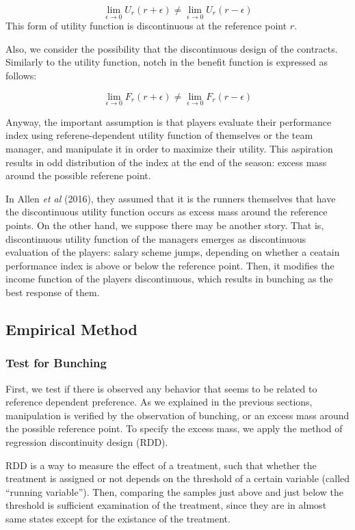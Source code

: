 \documentclass[dvipdfmx, 12pt]{article}
\begin{document}
\[
\lim_{\epsilon \to 0} U_r (r + \epsilon) \neq
\lim_{\epsilon \to 0} U_r (r - \epsilon)
\]
This form of utility function is discontinuous at the reference point $r$.

Also, we consider the possibility that the discontinuous design of the contracts. Similarly to the utility function, notch in the benefit function is expressed as follows:

\[
\lim_{\epsilon \to 0} F_r (r + \epsilon) \neq
\lim_{\epsilon \to 0} F_r (r - \epsilon)
\]

Anyway, the important assumption is that players evaluate their performance index using referene-dependent utility function of themselves or the team manager, and manipulate it in order to maximize their utility. This aspiration results in odd distribution of the index at the end of the season: excess mass around the possible referene point.

In Allen \textit{et al} (2016), they assumed that it is the runners  themselves that have the discontinuous utility function occurs as excess mass around the reference points. On the other hand, we suppose there may be another story. That is, discontinuous utility function of the managers emerges as discontinuous evaluation of the players: salary scheme jumps, depending on whether a ceatain performance index is above or below the reference point. Then, it modifies the income function of the players discontinuous, which results in bunching as the best response of them.

 \subsection{Empirical Method}

  \subsubsection{Test for Bunching}

  First, we test if there is observed any behavior that seems to be related to reference dependent preference. As we explained in the previous sections, manipulation is verified by the observation of bunching, or an excess mass around the possible reference point. To specify the excess mass, we apply the method of regression discontinuity design (RDD).

  RDD is a way to measure the effect of a treatment, such that whether the treatment is assigned or not depends on the threshold of a certain variable (called ``running variable''). Then, comparing the samples just above and just below the threshold is sufficient examination of the treatment, since they are in almost same states except for the existance of the treatment.
\end{document}
